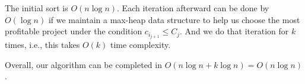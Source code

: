 






The initial sort is $O(n\log n)$. Each iteration afterward can be done by $O(\log n)$ if we maintain a max-heap data structure to help us choose the most profitable project under the condition $c_{i_{j+1}} \leq C_j$. And we do that iteration for $k$ times, i.e., this takes $O(k)$ time complexity. 

Overall, our algorithm can be completed in $O(n\log n+ k\log n)=O(n\log n)$.







